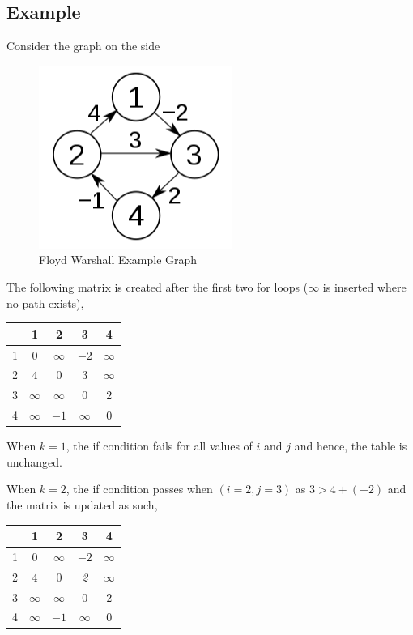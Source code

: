 \documentclass{article}
\begin{document}
\subsection{Example}
Consider the graph on the side\\
\begin{figure}
    \begin{center}
        \includegraphics{fwa.png}
        \caption{Floyd Warshall Example Graph}
    \end{center}
    \label{fig:fwa}
\end{figure}
The following matrix is created after the first two for loops ($\infty$ is inserted where no path exists),\\
\begin{tabular}{|c||c|c|c|c|}
\hline
& 1 & 2 & 3 & 4 \\
\hline
\hline
1 & $0$ & $\infty$ & $-2$ & $\infty$ \\
\hline
2 & $4$ & $0$ & $3$ & $\infty$ \\
\hline
3 & $\infty$ & $\infty$ & $0$ & $2$ \\
\hline
4 & $\infty$ & $-1$ & $\infty$ & $0$ \\
\hline
\end{tabular}
\par
When $k=1$, the if condition fails for all values of $i$ and $j$ and hence, the table is unchanged.
\par
When $k=2$, the if condition passes when $(i=2,j=3)$ as $3 > 4 + (-2)$ and the matrix is updated as such,\\
\begin{tabular}{|c||c|c|c|c|}
\hline
& 1 & 2 & 3 & 4 \\
\hline
\hline
1 & $0$ & $\infty$ & $-2$ & $\infty$ \\
\hline
2 & $4$ & $0$ & \textit{2} & $\infty$ \\
\hline
3 & $\infty$ & $\infty$ & $0$ & $2$ \\
\hline
4 & $\infty$ & $-1$ & $\infty$ & $0$ \\
\hline
\end{tabular}
\end{document}
